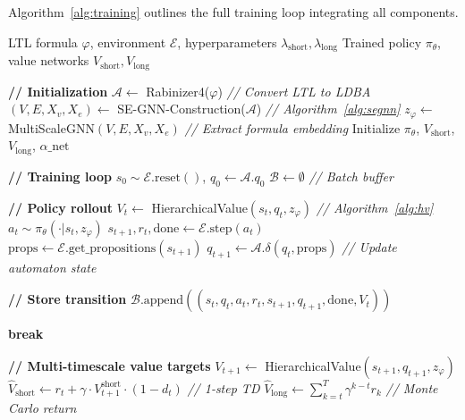 \documentclass{article}
\begin{document}
Algorithm~\ref{alg:training} outlines the full training loop integrating all components.

\begin{algorithm}[htbp]
\caption{HiLTL Training with Multi-Scale RL}
\label{alg:training}
\begin{algorithmic}[1]
\REQUIRE LTL formula $\varphi$, environment $\mathcal{E}$, hyperparameters $\lambda_{\text{short}}, \lambda_{\text{long}}$
\ENSURE Trained policy $\pi_\theta$, value networks $V_{\text{short}}, V_{\text{long}}$

\STATE \textbf{// Initialization}
\STATE $\mathcal{A} \gets$ Rabinizer4($\varphi$) \hfill \textit{// Convert LTL to LDBA}
\STATE $(V, E, X_v, X_e) \gets$ SE-GNN-Construction($\mathcal{A}$) \hfill \textit{// Algorithm~\ref{alg:segnn}}
\STATE $z_\varphi \gets$ MultiScaleGNN$(V, E, X_v, X_e)$ \hfill \textit{// Extract formula embedding}
\STATE Initialize $\pi_\theta$, $V_{\text{short}}$, $V_{\text{long}}$, $\alpha\_\text{net}$

\STATE \textbf{// Training loop}
    \STATE $s_0 \sim \mathcal{E}.\text{reset}()$, $q_0 \gets \mathcal{A}.q_0$
    \STATE $\mathcal{B} \gets \emptyset$ \hfill \textit{// Batch buffer}
    
        \STATE \textbf{// Policy rollout}
        \STATE $V_t \gets$ HierarchicalValue$(s_t, q_t, z_\varphi)$ \hfill \textit{// Algorithm~\ref{alg:hv}}
        \STATE $a_t \sim \pi_\theta(\cdot | s_t, z_\varphi)$
        \STATE $s_{t+1}, r_t, \text{done} \gets \mathcal{E}.\text{step}(a_t)$
        \STATE $\text{props} \gets \mathcal{E}.\text{get\_propositions}(s_{t+1})$
        \STATE $q_{t+1} \gets \mathcal{A}.\delta(q_t, \text{props})$ \hfill \textit{// Update automaton state}
        
        \STATE \textbf{// Store transition}
        \STATE $\mathcal{B}.\text{append}((s_t, q_t, a_t, r_t, s_{t+1}, q_{t+1}, \text{done}, V_t))$
        
            \STATE \textbf{break}
        \ENDIF
    \ENDFOR
    
    \STATE \textbf{// Multi-timescale value targets}
        \STATE $V_{t+1} \gets$ HierarchicalValue$(s_{t+1}, q_{t+1}, z_\varphi)$
        \STATE $\hat{V}_{\text{short}} \gets r_t + \gamma \cdot V_{t+1}^{\text{short}} \cdot (1 - d_t)$ \hfill \textit{// 1-step TD}
        \STATE $\hat{V}_{\text{long}} \gets \sum_{k=t}^{T} \gamma^{k-t} r_k$ \hfill \textit{// Monte Carlo return}
    \ENDFOR
    

\end{algorithmic}
\end{algorithm}
\end{document}
